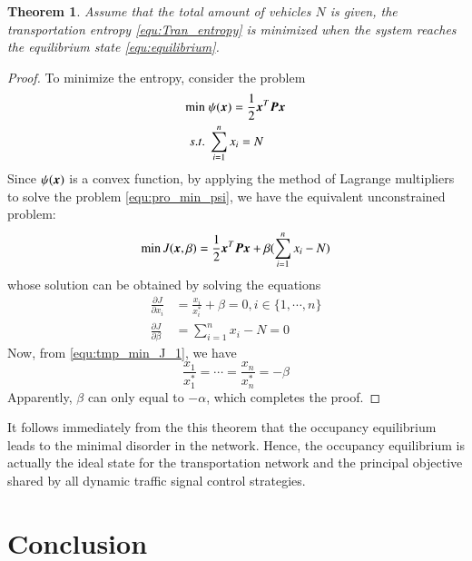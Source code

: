 \documentclass[preprint,authoryear,12pt]{elsarticle}
\renewcommand{\vec}[1]{\mbox{\boldmath$#1$}}
\newcommand{\mat}[1]{\mbox{\boldmath$#1$}}
\newtheorem{thm}{Theorem}
\begin{document}

\begin{thm}\label{thm:entropy_equilibrium}
Assume that the total amount of vehicles $N$ is given, the transportation entropy \eqref{equ:Tran_entropy} is minimized when the system reaches the equilibrium state \eqref{equ:equilibrium}.
\end{thm}
\begin{proof}
To minimize the entropy, consider the problem
\begin{align}\label{equ:pro_min_psi}
\min\; &\psi(\vec{x}) = \frac{1}{2}\vec{x}^T\mat{P}\vec{x}\\
s.t.\; &\sum_{i=1}^n x_i = N \nonumber
\end{align}
Since $\psi(\vec{x})$ is a convex function, by applying the method of Lagrange multipliers to solve the problem \eqref{equ:pro_min_psi}, we have the equivalent unconstrained problem:
$$\min J(\vec{x},\beta) =
\frac{1}{2}\vec{x}^T\mat{P}\vec{x}+\beta(\sum_{i=1}^n x_i - N)$$
whose solution can be obtained by solving the equations
\begin{align}
\label{equ:tmp_min_J_1}
\frac{\partial J}{\partial x_i} &= \frac{x_i}{x_i^*}+\beta =0,
i\in\{1,\cdots,n\}\\
\label{equ:tmp_min_J_2}
\frac{\partial J}{\partial \beta} &= \sum_{i=1}^n x_i - N =0
\end{align}
Now, from \eqref{equ:tmp_min_J_1}, we have
$$\frac{x_1}{x_1^*}=\cdots=\frac{x_n}{x_n^*}=-\beta
$$
Apparently, $\beta$ can only equal to $-\alpha$, which completes the proof.
\end{proof}

It follows immediately from the this theorem that the occupancy equilibrium leads to the minimal disorder in the network. Hence, the occupancy equilibrium is actually the ideal state for the transportation network and the principal objective shared by all dynamic traffic signal control strategies.

\section{Conclusion}
\end{document}
